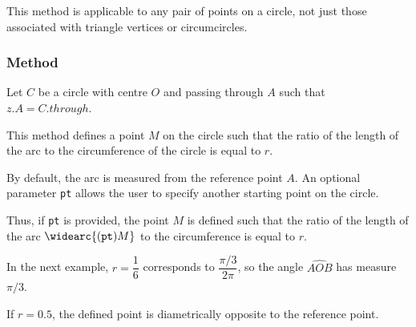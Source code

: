 \medskip

This method is applicable to any pair of points on a circle, not just those associated with triangle vertices or circumcircles.

\vspace{1em}
\begin{tkzexample}[latex=.5\textwidth]
\begin{center}
  \end{center}
\end{tkzexample}

\subsubsection{Method }
\label{ssub:method_circle_point}

Let $C$ be a circle with centre $O$ and passing through $A$ such that $z.A = C.through$.

This method defines a point $M$ on the circle such that the ratio of the length of the arc to the circumference of the circle is equal to $r$.

By default, the arc is measured from the reference point $A$.
An optional parameter \texttt{pt} allows the user to specify another starting point on the circle.

Thus, if \texttt{pt} is provided, the point $M$ is defined such that
the ratio of the length of the arc $\widearc{(\texttt{pt})M}$ to the circumference is equal to $r$.

In the next example, $r=\dfrac{1}{6}$ corresponds to $\dfrac{\pi/3}{2\pi}$, so the angle $\widehat{AOB}$ has measure $\pi/3$.

If $r=0.5$, the defined point is diametrically opposite to the reference point.

\vspace{1em}
\begin{tkzexample}[latex=.5\textwidth]
\begin{center}
\end{center}
\end{tkzexample}



